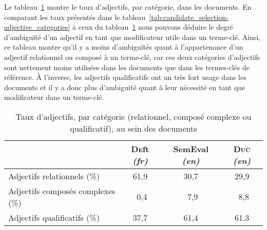       Le tableau~\ref{tab:candidate_selection-adjective_categories_in_documents}
      montre le taux d'adjectifs, par catégorie, dans les documents. En
      comparant les taux présentés dans le
      tableau~\ref{tab:candidate_selection-adjective_categories} à ceux du
      tableau~\ref{tab:candidate_selection-adjective_categories_in_documents}
      nous pouvons déduire le degré d'ambiguïté d'un adjectif en tant que
      modificateur utile dans un terme-clé. Ainsi, ce tableau montre qu'il y a
      moins d'ambiguïtés quant à l'appartenance d'un adjectif relationnel ou
      composé à un terme-clé, car ces deux catégories d'adjectifs sont nettement
      moins utilisées dans les documents que dans les termes-clés de référence.
      À l'inverse, les adjectifs qualificatifs ont un très fort usage dans les
      documents et il y a donc plus d'ambiguïté quant à leur nécessité en tant
      que modificateur dans un terme-clé.
      \begin{table}[!h]
        \centering
          \begin{tabular}{l|ccc}
            \toprule
            & \textbf{\textsc{De}ft} \textit{(fr)} & \textbf{SemEval} \textit{(en)} & \textbf{\textsc{Duc}} \textit{(en)}\\
            \hline
            Adjectifs relationnels \hfill(\%) & 61,9 & 30,7 & 29,9\\
            Adjectifs composés complexes \hfill(\%) & $~~$0,4 & $~~$7,9 & $~~$8,8\\
            Adjectifs qualificatifs \hfill(\%) & 37,7 & 61,4 & 61,3\\
            \bottomrule
        \end{tabular}
        \caption{Taux d'adjectifs, par catégorie (relationnel, composé complexe
                 ou qualificatif), au sein des documents}
                 \label{tab:candidate_selection-adjective_categories_in_documents}
      \end{table}


